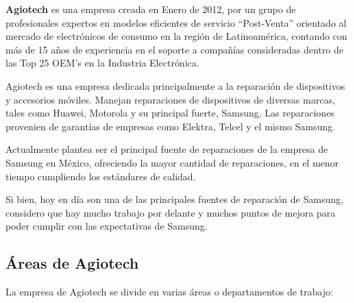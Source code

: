 \textbf{Agiotech} es una empresa creada en Enero de 2012, por un grupo de
profesionales expertos en modelos eficientes de servicio ``Post-Venta''
orientado al mercado de electrónicos de consumo en la región de Latinoamérica, contando
con más de 15 años de experiencia en el soporte a compañías consideradas dentro de
las Top 25 OEM's en la Industria Electrónica.

Agiotech es una empresa dedicada principalmente a la reparación de dispositivos y
accesorios móviles. Manejan reparaciones de dispositivos de diversas marcas, tales
como Huawei, Motorola y su principal fuerte, Samsung. Las reparaciones provenien
de garantías de empresas como Elektra, Telcel y el mismo Samsung.

Actualmente plantea ser el principal fuente de reparaciones de la empresa de Samsung
en México, ofreciendo la mayor cantidad de reparaciones, en el menor tiempo cumpliendo
los estándares de calidad.

Si bien, hoy en día son una de las principales fuentes de reparación de Samsung,
considero que hay mucho trabajo por delante y muchos puntos de mejora para poder
cumplir con las expectativas de Samsung.

\subsection{Áreas de Agiotech}

La empresa de Agiotech se divide en varias áreas o departamentos de trabajo:

